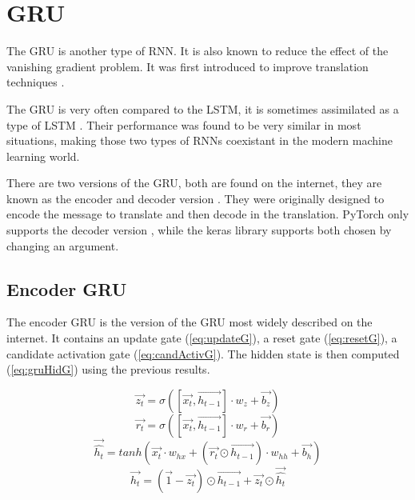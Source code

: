 \section{\acs{GRU}}
The \acf{GRU} is another type of \ac{RNN}. It is also known to reduce the effect of the vanishing gradient problem. It was first introduced to improve translation techniques \cite{gru}.

The \ac{GRU} is very often compared to the \ac{LSTM}, it is sometimes assimilated as a type of \ac{LSTM} \cite{nbLSTM}. Their performance was found to be very similar in most situations, making those two types of \acp{RNN} coexistant in the modern machine learning world.

There are two versions of the \ac{GRU}, both are found on the internet, they are known as the encoder and decoder version \cite{gru}. They were originally designed to encode the message to translate and then decode in the translation. PyTorch only supports the decoder version \cite{gruPyTorch}, while the keras library supports both \cite{gruKeras} chosen by changing an argument.

\subsection{Encoder \ac{GRU}}

The encoder \ac{GRU} is the version of the \ac{GRU} most widely described on the internet. It contains an update gate (\cref{eq:updateG}), a reset gate (\cref{eq:resetG}), a candidate activation gate (\cref{eq:candActivG}). The hidden state is then computed (\cref{eq:gruHidG}) using the previous results.

\begin{equation}\label{eq:updateG}
  \overrightarrow{z_t}=\sigma ([\overrightarrow{x_t},\overrightarrow{h_{t-1}}] \cdot w_z + \overrightarrow{b_z})
\end{equation}
\begin{equation}\label{eq:resetG}
  \overrightarrow{r_t}=\sigma ([\overrightarrow{x_t},\overrightarrow{h_{t-1}}] \cdot w_r + \overrightarrow{b_r})
\end{equation}
\begin{equation}\label{eq:candActivG}
  \overrightarrow{\hat{h_t}}=tanh(\overrightarrow{x_t}\cdot w_{hx}+(\overrightarrow{r_t}\odot\overrightarrow{h_{t-1}}) \cdot w_{hh} + \overrightarrow{b_h})
\end{equation}
\begin{equation}\label{eq:gruHidG}
  \overrightarrow{h_t}=(\overrightarrow{1}-\overrightarrow{z_t})\odot \overrightarrow{h_{t-1}} + \overrightarrow{z_t}\odot \overrightarrow{\hat{h_t}}
\end{equation}

